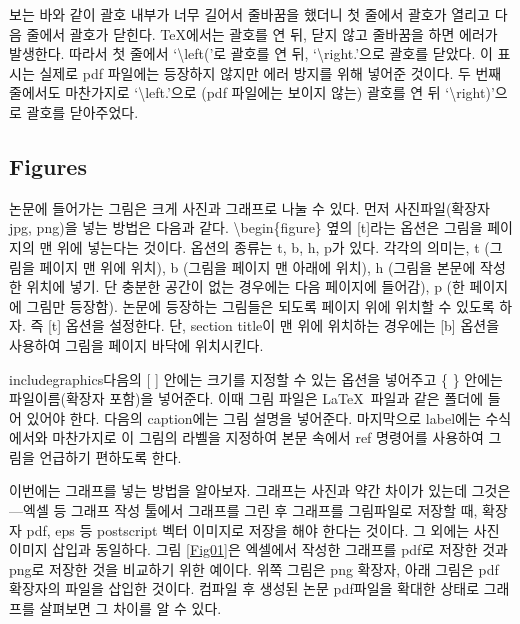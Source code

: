 \documentclass{gshs-report-v1.2}
\begin{document}
보는 바와 같이 괄호 내부가 너무 길어서 줄바꿈을 했더니 첫 줄에서 괄호가 열리고 다음 줄에서 괄호가 닫힌다. \TeX 에서는 괄호를 연 뒤, 닫지 않고 줄바꿈을 하면 에러가 발생한다. 따라서 첫 줄에서 `{\textbackslash}left('로 괄호를 연 뒤, `{\textbackslash}right.'으로 괄호를 닫았다. 이 표시는 실제로 pdf 파일에는 등장하지 않지만 에러 방지를 위해 넣어준 것이다. 두 번째 줄에서도 마찬가지로 `{\textbackslash}left.'으로 (pdf 파일에는 보이지 않는) 괄호를 연 뒤 `{\textbackslash}right)'으로 괄호를 닫아주었다.


\subsection{Figures}
논문에 들어가는 그림은 크게 사진과 그래프로 나눌 수 있다. 먼저 사진파일(확장자 jpg, png)을 넣는 방법은 다음과 같다.
{\textbackslash}begin\{figure\} 옆의 [t]라는 옵션은 그림을 페이지의 맨 위에 넣는다는 것이다. 옵션의 종류는 t, b, h, p가 있다. 각각의 의미는, t (그림을 페이지 맨 위에 위치), b (그림을 페이지 맨 아래에 위치), h (그림을 본문에 작성한 위치에 넣기. 단 충분한 공간이 없는 경우에는 다음 페이지에 들어감), p (한 페이지에 그림만 등장함). 논문에 등장하는 그림들은 되도록 페이지 위에 위치할 수 있도록 하자. 즉 [t] 옵션을 설정한다. 단, section title이 맨 위에 위치하는 경우에는 [b] 옵션을 사용하여 그림을 페이지 바닥에 위치시킨다.

includegraphics다음의 [ ] 안에는 크기를 지정할 수 있는 옵션을 넣어주고 \{ \} 안에는 파일이름(확장자 포함)을 넣어준다. 이때 그림 파일은 \LaTeX\ 파일과 같은 폴더에 들어 있어야 한다. 다음의 caption에는 그림 설명을 넣어준다. 마지막으로 label에는 수식에서와 마찬가지로 이 그림의 라벨을 지정하여 본문 속에서 ref 명령어를 사용하여 그림을 언급하기 편하도록 한다.

이번에는 그래프를 넣는 방법을 알아보자. 그래프는 사진과 약간 차이가 있는데 그것은---엑셀 등 그래프 작성 툴에서 그래프를 그린 후 그래프를 그림파일로 저장할 때, 확장자 pdf, eps 등 postscript 벡터 이미지로 저장을 해야 한다는 것이다. 그 외에는 사진 이미지 삽입과 동일하다. 그림 \ref{Fig01}은 엑셀에서 작성한 그래프를 pdf로 저장한 것과 png로 저장한 것을 비교하기 위한 예이다. 위쪽 그림은 png 확장자, 아래 그림은 pdf 확장자의 파일을 삽입한 것이다. 컴파일 후 생성된 논문 pdf파일을 확대한 상태로 그래프를 살펴보면 그 차이를 알 수 있다.
\end{document}
